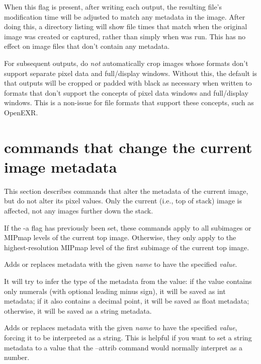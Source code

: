When this flag is present, after writing each output, the resulting
file's modification time will be adjusted to match any 
metadata in the image.  After doing this, a directory listing will show
file times that match when the original image was created or captured,
rather than simply when \oiiotool was run.  This has no effect on
image files that don't contain any  metadata.
\apiend

For subsequent outputs, do \emph{not} automatically crop images whose
formats don't support separate pixel data and full/display windows.
Without this, the default is that outputs will be cropped or padded with
black as necessary when written to formats that don't support the
concepts of pixel data windows and full/display windows.  This is a
non-issue for file formats that support these concepts, such as OpenEXR.
\apiend

\section{\oiiotool commands that change the current image metadata}

This section describes \oiiotool commands that alter the metadata
of the current image, but do not alter its pixel values.  Only the
current (i.e., top of stack) image is affected, not any images further
down the stack.

If the {\cf -a} flag has previously been set, these commands apply to
all subimages or MIPmap levels of the current top image.  Otherwise,
they only apply to the highest-resolution MIPmap level of the first
subimage of the current top image.

Adds or replaces metadata with the given \emph{name} to have the 
specified \emph{value}.

It will try to infer the type of the metadata from the value: if the
value contains only numerals (with optional leading minus sign), it will
be saved as {\cf int} metadata; if it also contains a decimal point, it
will be saved as {\cf float} metadata; otherwise, it will be saved as
a {\cf string} metadata.
\apiend

Adds or replaces metadata with the given \emph{name} to have the 
specified \emph{value}, forcing it to be interpreted as a {\cf string}.
This is helpful if you want to set a {\cf string} metadata to a value
that the {\cf --attrib} command would normally interpret as a number.
\apiend

